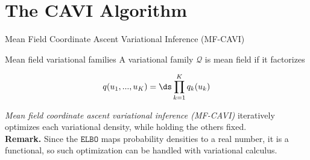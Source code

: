 \documentclass[10pt]{beamer}
\renewcommand{\ELBO}{\texttt{ELBO}}
\renewcommand{\Q}{\mathcal{Q}}
\begin{document}
\section{The CAVI Algorithm}

\begin{frame}{Mean Field Coordinate Ascent Variational Inference (MF-CAVI)}

\begin{block}{Mean field variational families}
A variational family $\Q$ is mean field if it factorizes 

\begin{equation} \label{mean_field}
q(u_1, ..., u_K) = \ds\prod_{k=1}^K q_k(u_k)
\end{equation}
\end{block}

\textit{Mean field coordinate ascent variational inference (MF-CAVI)} iteratively optimizes each variational density, while holding the others fixed. \\
\vfill \vfill 
\pause 
\colorbox{blue!30}{\textbf{Remark.}} Since the $\ELBO$ maps probability densities to a real number, it is a functional, so such optimization can be handled with variational calculus.   
   
\end{frame}
\end{document}
